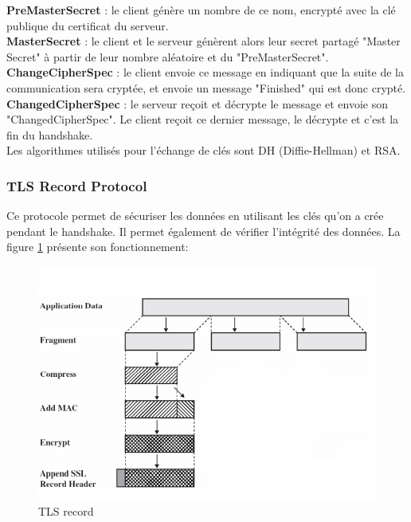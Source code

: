 \textbf{PreMasterSecret} : le client génère un nombre de ce nom, encrypté avec la clé publique du certificat du serveur.\\

\textbf{MasterSecret} : le client et le serveur génèrent alors leur secret partagé "Master Secret" à partir de leur nombre aléatoire et du "PreMasterSecret".\\

\textbf{ChangeCipherSpec} : le client envoie ce message en indiquant que la suite de la communication sera cryptée, et envoie un message "Finished" qui est donc crypté.\\

\textbf{ChangedCipherSpec} : le serveur reçoit et décrypte le message et envoie son "ChangedCipherSpec".  Le client reçoit ce dernier message, le décrypte et c'est la fin du handshake.\\

Les algorithmes utilisés pour l'échange de clés sont DH (Diffie-Hellman) et RSA. 

\subsubsection{TLS Record Protocol}


Ce protocole permet de sécuriser les données en utilisant les clés qu'on a crée pendant le handshake. Il permet également de vérifier l'intégrité des données. La figure \ref{record} présente son fonctionnement:
\begin{figure}[H]
\centering
\includegraphics[scale=0.7]{img/tls-record.png}
\caption{TLS record}
\label{record}
\end{figure}


